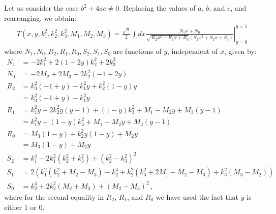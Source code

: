 \documentclass[twoside]{article}
\begin{document}
Let us consider the case $b^2 + 4 a c \neq 0$.
Replacing the values of $a$, $b$, and $c$, and rearranging, we obtain:
\begin{align}
  T(x, y, k^2_1, k^2_2, k^2_3, M_1, M_2, M_3) = \frac{\sqrt{\pi}}{2}\int dx \left.\frac{N_1 x + N_0}{\sqrt{R_2 x^2 + R_1 x + R_0}\left(S_2 x^2 + S_1 x + S_0\right)}\right|^{y = 1}_{y = 0}
\end{align}
where $N_1, N_0, R_2, R_1, R_0, S_2, S_1, S_0$ are functions of $y$, independent of $x$, given by:
\begin{align*}
N_1 &= - 2 k_1^2+ 2 (1-2y) k_2^2 + 2 k_3^2\\
N_0 &= -2 M_2 + 2 M_3 + 2 k_2^2 (-1+2y) \\
R_2 &= k_3^2 (-1 + y) - k_1^2 y + k_2^2 (1 - y) y\\
& = k_3^2 (-1 + y) - k_1^2 y \\
R_1 &= k_1^2 y+ 2 k_2^2 y\left(y-1\right)+(1-y) k_3^2 + M_1 - M_2 y+M_3 (y-1) \\
&= k_1^2 y +(1-y) k_3^2 + M_1 - M_2 y+M_3 (y-1)\\
R_0 &= M_3 (1-y) + k_2^2 y (1-y) + M_2 y \\
&= M_3 (1-y) + M_2 y \\
S_2 &= k_1^4-2 k_1^2 (k_2^2+k_3^2)+(k_2^2-k_3^2)^2 \\
S_1 &= 2 \left(k_1^2 (k_2^2+M_2-M_3)-k_2^4+k_2^2 (k_3^2+2 M_1-M_2-M_3)+k_3^2 (M_3-M_2)\right) \\
S_0 &= k_2^4+2 k_2^2 (M_2+M_3)+(M_2-M_3)^2\,,
\end{align*}
where for the second equality in $R_2$, $R_1$, and $R_0$ we have used the fact that $y$ is either 1 or 0.
\end{document}
